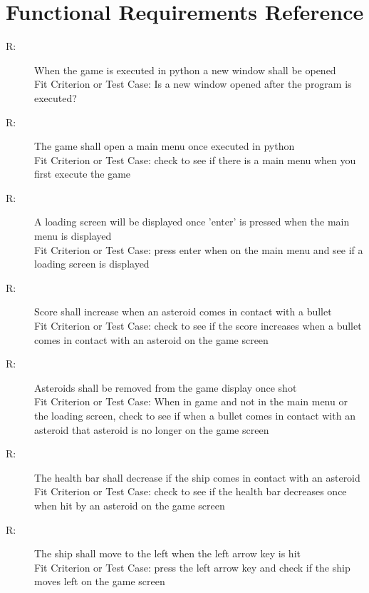 \documentclass[12pt, titlepage]{article}
\newcounter{fnum}
\newcommand{\fthefnum}{R\thefnum}
\begin{document}
\section{Functional Requirements Reference} \label{SecFunc}

\begin{description}

\item [ \fthefnum \label{fRA}:] 
When the game is executed in python a new window shall be opened
\\Fit Criterion or Test Case: Is a new window opened after the program is executed?

\item [ \fthefnum \label{fRB}:] 
The game shall open a main menu once executed in python
\\Fit Criterion or Test Case: check to see if there is a main menu when you first execute the game

\item [ \fthefnum \label{fRC}:] 
A loading screen will be displayed once 'enter' is pressed when the main menu is displayed
\\Fit Criterion or Test Case: press enter when on the main menu and see if a loading screen is displayed

\item [ \fthefnum \label{fRD}:] 
Score shall increase when an asteroid comes in contact with a bullet
\\Fit Criterion or Test Case: check to see if the score increases when a bullet comes in contact with an asteroid on the game screen

\item [ \fthefnum \label{fRE}:] 
Asteroids shall be removed from the game display once shot
\\Fit Criterion or Test Case: When in game and not in the main menu or the loading screen, check to see if when a bullet comes in contact with an asteroid that asteroid is no longer on the game screen

\item [ \fthefnum \label{fRF}:] 
The health bar shall decrease if the ship comes in contact with an asteroid
\\Fit Criterion or Test Case: check to see if the health bar decreases once when hit by an asteroid on the game screen

\item [ \fthefnum \label{fRG}:] 
The ship shall move to the left when the left arrow key is hit
\\Fit Criterion or Test Case: press the left arrow key and check if the ship moves left on the game screen


\end{description}
\end{document}
